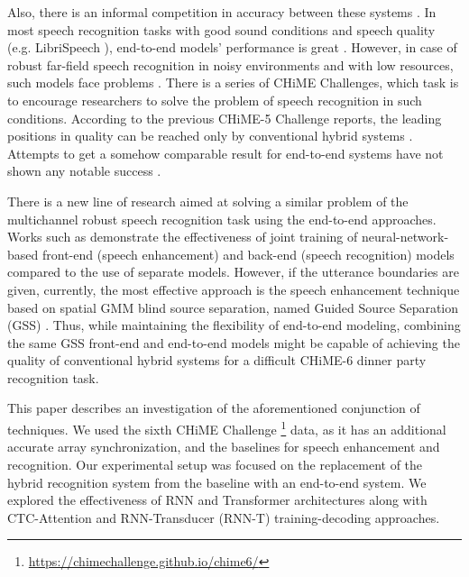\documentclass[a4paper]{article}
\begin{document}
Also, there is an informal competition in accuracy between these systems \cite{L_scher_2019}. In most speech recognition tasks with good sound conditions and speech quality (e.g. LibriSpeech \cite{panayotov_librispeech:_2015}), end-to-end models' performance is great \cite{synnaeve2019endtoend,li2019jasper,Zeyer_2018}. However, in case of robust far-field speech recognition in noisy environments and with low resources, such models face problems \cite{bataev_2018}. There is a series of CHiME Challenges, which task is to encourage researchers to solve the problem of speech recognition in such conditions. According to the previous CHiME-5 Challenge \cite{barker2018fifth} reports, the leading positions in quality can be reached only by conventional hybrid systems \cite{chime5_1,chime5_2,chime5_3}. Attempts to get a somehow comparable result for end-to-end systems have not shown any notable success \cite{chime5_e2e}.

There is a new line of research aimed at solving a similar problem of the multichannel robust speech recognition task using the end-to-end approaches. Works such as \cite{yalta2018cnnbased,subramanian2019investigation,Chang2019MIMOSpeechEM} demonstrate the effectiveness of joint training of neural-network-based front-end (speech enhancement) and back-end (speech recognition) models compared to the use of separate models. However, if the utterance boundaries are given, currently, the most effective approach is the speech enhancement technique based on spatial GMM blind source separation, named Guided Source Separation (GSS) \cite{boeddecker_front-end_2018}. Thus, while maintaining the flexibility of end-to-end modeling, combining the same GSS front-end and end-to-end models might be capable of achieving the quality of conventional hybrid systems for a difficult CHiME-6 dinner party recognition task.

This paper describes an investigation of the aforementioned conjunction of techniques. We used the sixth CHiME Challenge \footnote{\url{https://chimechallenge.github.io/chime6/}} data, as it has an additional accurate array synchronization, and the baselines for speech enhancement and recognition. Our experimental setup was focused on the replacement of the hybrid recognition system from the baseline with an end-to-end system. We explored the effectiveness of RNN and Transformer architectures along with CTC-Attention and RNN-Transducer (RNN-T) training-decoding approaches.
\end{document}
